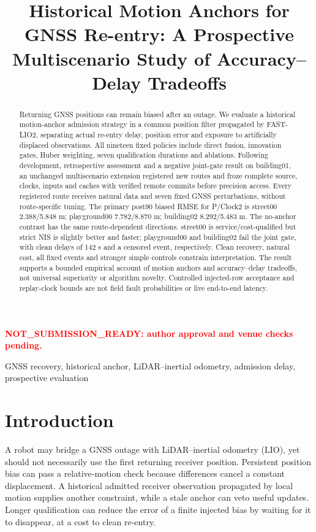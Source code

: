 \documentclass[conference]{IEEEtran}
\title{Historical Motion Anchors for GNSS Re-entry: A Prospective Multiscenario Study of Accuracy--Delay Tradeoffs}
\author{\IEEEauthorblockN{Internal author-review draft: authors and affiliations unassigned}}
\newcommand{\reviewmark}{\textcolor{red}{\textbf{NOT\_SUBMISSION\_READY: author approval and venue checks pending.}}}
\begin{document}
\maketitle
\begin{center}\small\reviewmark\end{center}
\begin{abstract}
Returning GNSS positions can remain biased after an outage. We evaluate a historical motion-anchor admission strategy in a common position filter propagated by FAST-LIO2, separating actual re-entry delay, position error and exposure to artificially displaced observations. All nineteen fixed policies include direct fusion, innovation gates, Huber weighting, seven qualification durations and ablations. Following development, retrospective assessment and a negative joint-gate result on building01, an unchanged multiscenario extension registered new routes and froze complete source, clocks, inputs and caches with verified remote commits before precision access. Every registered route receives natural data and seven fixed GNSS perturbations, without route-specific tuning. The primary post90 biased RMSE for P/Clock2 is street00 2.388/5.848 m; playground00 7.782/8.870 m; building02 8.292/5.483 m. The no-anchor contrast has the same route-dependent directions. street00 is service/cost-qualified but strict NIS is slightly better and faster; playground00 and building02 fail the joint gate, with clean delays of 142 s and a censored event, respectively. Clean recovery, natural cost, all fixed events and stronger simple controls constrain interpretation. The result supports a bounded empirical account of motion anchors and accuracy--delay tradeoffs, not universal superiority or algorithm novelty. Controlled injected-row acceptance and replay-clock bounds are not field fault probabilities or live end-to-end latency.
\end{abstract}
\begin{IEEEkeywords}GNSS recovery, historical anchor, LiDAR--inertial odometry, admission delay, prospective evaluation\end{IEEEkeywords}
\section{Introduction}
A robot may bridge a GNSS outage with LiDAR--inertial odometry (LIO), yet should not necessarily use the first returning receiver position. Persistent position bias can pass a relative-motion check because differences cancel a constant displacement. A historical admitted receiver observation propagated by local motion supplies another constraint, while a stale anchor can veto useful updates. Longer qualification can reduce the error of a finite injected bias by waiting for it to disappear, at a cost to clean re-entry.
\end{document}
